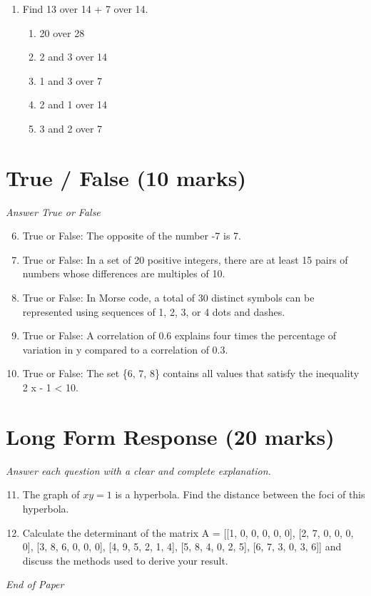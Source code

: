 \documentclass[12pt]{article}
\begin{document}
\begin{enumerate}[label=\arabic*.]
\begin{enumerate}[label=(\alph*)]
    \item 19.0
    \item 17.0
    \item 25.0
    \item 23.0
    \item 18.0
\end{enumerate}
\item Find 13 over 14 + 7 over 14.
\begin{enumerate}[label=(\alph*)]
    \item 20 over 28
    \item 2 and 3 over 14
    \item 1 and 3 over 7
    \item 2 and 1 over 14
    \item 3 and 2 over 7
\end{enumerate}
\end{enumerate}

\section*{True / False (10 marks)}
\textit{Answer True or False}
\begin{enumerate}[label=\arabic*.]
\setcounter{enumi}{5}
\item True or False: The opposite of the number -7 is 7.
\item True or False: In a set of 20 positive integers, there are at least 15 pairs of numbers whose differences are multiples of 10.
\item True or False: In Morse code, a total of 30 distinct symbols can be represented using sequences of 1, 2, 3, or 4 dots and dashes.
\item True or False: A correlation of 0.6 explains four times the percentage of variation in y compared to a correlation of 0.3.
\item True or False: The set \{6, 7, 8\} contains all values that satisfy the inequality 2 x - 1 \textless{} 10.
\end{enumerate}

\section*{Long Form Response (20 marks)}
\textit{Answer each question with a clear and complete explanation.}
\begin{enumerate}[label=\arabic*.]
\setcounter{enumi}{10}
\item The graph of $xy = 1$ is a hyperbola. Find the distance between the foci of this hyperbola.
\item Calculate the determinant of the matrix A = [[1, 0, 0, 0, 0, 0], [2, 7, 0, 0, 0, 0], [3, 8, 6, 0, 0, 0], [4, 9, 5, 2, 1, 4], [5, 8, 4, 0, 2, 5], [6, 7, 3, 0, 3, 6]] and discuss the methods used to derive your result.
\end{enumerate}

\vfill
\noindent\textit{End of Paper}
\end{document}
